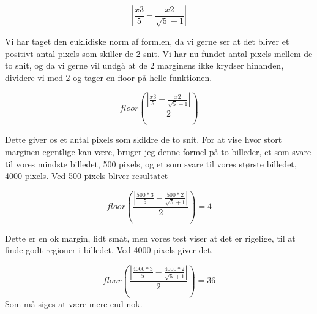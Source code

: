 \begin{equation}
	|\frac{x3}{5} - \frac{x2}{\sqrt{5}+1}| 
\end{equation}

Vi har taget den euklidiske norm af formlen, da vi gerne ser at det
bliver et positivt antal pixels som skiller de 2 snit. Vi har nu
fundet antal pixels mellem de to snit, og da vi gerne vil undgå at de 2
marginens ikke krydser hinanden, dividere vi med 2 og tager en floor på
helle funktionen.

\begin{equation}
	floor(\frac{|\frac{x3}{5} - \frac{x2}{\sqrt{5}+1}| }{2})
\end{equation}

Dette giver os et antal pixels som skildre de to snit. For at vise
hvor stort marginen egentlige kan være, bruger jeg denne formel på to
billeder, et som svare til vores mindste billedet, 500 pixels, og et
som svare til vores største billedet, 4000 pixels. Ved 500 pixels
bliver resultatet

\begin{equation}
	floor(\frac{|\frac{500*3}{5} - \frac{500*2}{\sqrt{5}+1}| }{2}) = 4
\end{equation}

Dette er en ok margin, lidt småt, men vores test viser at det er
rigelige, til at finde godt regioner i billedet.
Ved 4000 pixels giver det.

\begin{equation}
	floor(\frac{|\frac{4000*3}{5} - \frac{4000*2}{\sqrt{5}+1}| }{2}) = 36
\end{equation}
Som må siges at være mere end nok.
